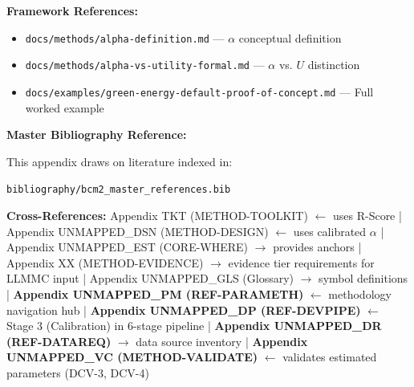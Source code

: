 \textbf{Framework References:}
\begin{itemize}[nosep]
\item \texttt{docs/methods/alpha-definition.md} --- $\alpha$ conceptual definition
\item \texttt{docs/methods/alpha-vs-utility-formal.md} --- $\alpha$ vs. $U$ distinction
\item \texttt{docs/examples/green-energy-default-proof-of-concept.md} --- Full worked example
\end{itemize}

\textbf{Master Bibliography Reference:}

This appendix draws on literature indexed in:

\texttt{bibliography/bcm2\_master\_references.bib}

\nocite{bcm2_master}


\begin{tcolorbox}[colback=gray!5!white, colframe=gray!50!black]
\small
\textbf{Cross-References:}
Appendix TKT (METHOD-TOOLKIT) $\leftarrow$ uses R-Score |
Appendix UNMAPPED_DSN (METHOD-DESIGN) $\leftarrow$ uses calibrated $\alpha$ |
Appendix UNMAPPED_EST (CORE-WHERE) $\rightarrow$ provides anchors |
Appendix XX (METHOD-EVIDENCE) $\rightarrow$ evidence tier requirements for LLMMC input |
Appendix UNMAPPED_GLS (Glossary) $\rightarrow$ symbol definitions |
\textbf{Appendix UNMAPPED_PM (REF-PARAMETH)} $\leftarrow$ methodology navigation hub |
\textbf{Appendix UNMAPPED_DP (REF-DEVPIPE)} $\leftarrow$ Stage 3 (Calibration) in 6-stage pipeline |
\textbf{Appendix UNMAPPED_DR (REF-DATAREQ)} $\rightarrow$ data source inventory |
\textbf{Appendix UNMAPPED_VC (METHOD-VALIDATE)} $\leftarrow$ validates estimated parameters (DCV-3, DCV-4)
\end{tcolorbox}

